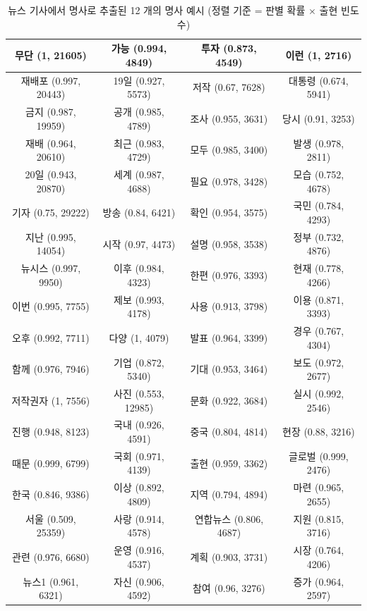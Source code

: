 \documentclass[11pt]{article}
\begin{document}
\begin{table}[H]
  \centering
  \caption{뉴스 기사에서 명사로 추출된 12 개의 명사 예시 (정렬 기준 = 판별 확률 $\times$ 출현 빈도수)}
  \label{tab:news_frequent_top100}
    \begin{tabular}{|c|c|c|c|}
\hline
무단 (1, 21605) & 가능 (0.994, 4849) & 투자 (0.873, 4549) & 이런 (1, 2716) \\ \hline
재배포 (0.997, 20443) & 19일 (0.927, 5573) & 저작 (0.67, 7628) & 대통령 (0.674, 5941) \\ \hline
금지 (0.987, 19959) & 공개 (0.985, 4789) & 조사 (0.955, 3631) & 당시 (0.91, 3253) \\ \hline
재배 (0.964, 20610) & 최근 (0.983, 4729) & 모두 (0.985, 3400) & 발생 (0.978, 2811) \\ \hline
20일 (0.943, 20870) & 세계 (0.987, 4688) & 필요 (0.978, 3428) & 모습 (0.752, 4678) \\ \hline
기자 (0.75, 29222) & 방송 (0.84, 6421) & 확인 (0.954, 3575) & 국민 (0.784, 4293) \\ \hline
지난 (0.995, 14054) & 시작 (0.97, 4473) & 설명 (0.958, 3538) & 정부 (0.732, 4876) \\ \hline
뉴시스 (0.997, 9950) & 이후 (0.984, 4323) & 한편 (0.976, 3393) & 현재 (0.778, 4266) \\ \hline
이번 (0.995, 7755) & 제보 (0.993, 4178) & 사용 (0.913, 3798) & 이용 (0.871, 3393) \\ \hline
오후 (0.992, 7711) & 다양 (1, 4079) & 발표 (0.964, 3399) & 경우 (0.767, 4304) \\ \hline
함께 (0.976, 7946) & 기업 (0.872, 5340) & 기대 (0.953, 3464) & 보도 (0.972, 2677) \\ \hline
저작권자 (1, 7556) & 사진 (0.553, 12985) & 문화 (0.922, 3684) & 실시 (0.992, 2546) \\ \hline
진행 (0.948, 8123) & 국내 (0.926, 4591) & 중국 (0.804, 4814) & 현장 (0.88, 3216) \\ \hline
때문 (0.999, 6799) & 국회 (0.971, 4139) & 출현 (0.959, 3362) & 글로벌 (0.999, 2476) \\ \hline
한국 (0.846, 9386) & 이상 (0.892, 4809) & 지역 (0.794, 4894) & 마련 (0.965, 2655) \\ \hline
서울 (0.509, 25359) & 사랑 (0.914, 4578) & 연합뉴스 (0.806, 4687) & 지원 (0.815, 3716) \\ \hline
관련 (0.976, 6680) & 운영 (0.916, 4537) & 계획 (0.903, 3731) & 시장 (0.764, 4206) \\ \hline
뉴스1 (0.961, 6321) & 자신 (0.906, 4592) & 참여 (0.96, 3276) & 증가 (0.964, 2597) \\ \hline

\end{tabular}
\end{table}
\end{document}
